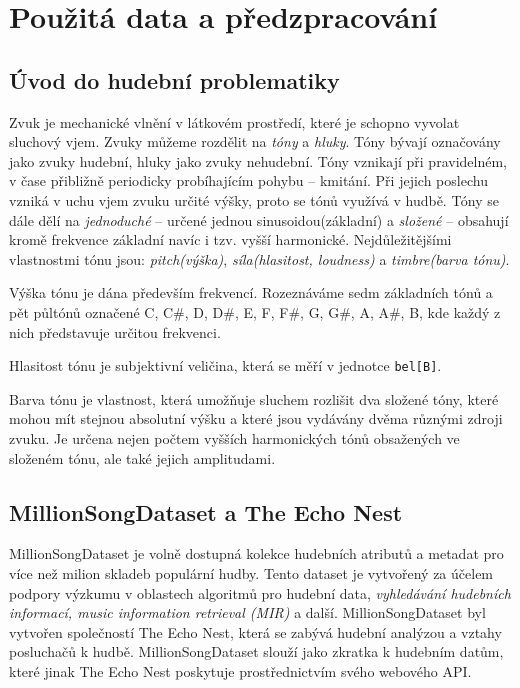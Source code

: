 \documentclass[thesis=M,czech]{FITthesis}[2012/06/26]
\begin{document}
\chapter{Použitá data a předzpracování}\label{ch:empl_prepro}
\section{Úvod do hudební problematiky}
Zvuk je mechanické vlnění v látkovém prostředí, které je schopno vyvolat sluchový vjem. Zvuky můžeme rozdělit na \textit{tóny} a \textit{hluky}. Tóny bývají označovány jako zvuky hudební, hluky jako zvuky nehudební. Tóny vznikají při pravidelném, v čase přibližně periodicky probíhajícím pohybu -- kmitání. Při jejich poslechu vzniká v uchu vjem zvuku určité výšky, proto se tónů využívá v hudbě. Tóny se dále dělí na \textit{jednoduché} -- určené jednou sinusoidou(základní) a \textit{složené} -- obsahují kromě frekvence základní navíc i tzv. vyšší harmonické. Nejdůležitějšími vlastnostmi tónu jsou: \textit{pitch(výška)}, \textit{síla(hlasitost, loudness)} a \textit{timbre(barva tónu)}.

Výška tónu je dána především frekvencí. Rozeznáváme sedm základních tónů a pět půltónů označené C, C\#, D, D\#, E, F, F\#, G, G\#, A, A\#, B, kde každý z nich představuje určitou frekvenci.

Hlasitost tónu je subjektivní veličina, která se měří v jednotce \texttt{bel[B]}.

Barva tónu je vlastnost, která umožňuje sluchem rozlišit dva složené tóny, které mohou mít stejnou absolutní výšku a které jsou vydávány dvěma různými zdroji zvuku. Je určena nejen počtem vyšších harmonických tónů obsažených ve složeném tónu, ale také jejich amplitudami. \cite{zvuk-ency}
 



\section{MillionSongDataset a The Echo Nest}
MillionSongDataset je volně dostupná kolekce hudebních atributů a metadat pro více než milion skladeb populární hudby. Tento dataset je vytvořený za účelem podpory výzkumu v oblastech algoritmů pro hudební data, \textit{vyhledávání hudebních informací, music information retrieval (MIR)} a další. MillionSongDataset byl vytvořen společností The Echo Nest, která se zabývá hudební analýzou a vztahy posluchačů k hudbě. MillionSongDataset slouží jako zkratka k hudebním datům, které jinak The Echo Nest poskytuje prostřednictvím svého webového API.
\end{document}
